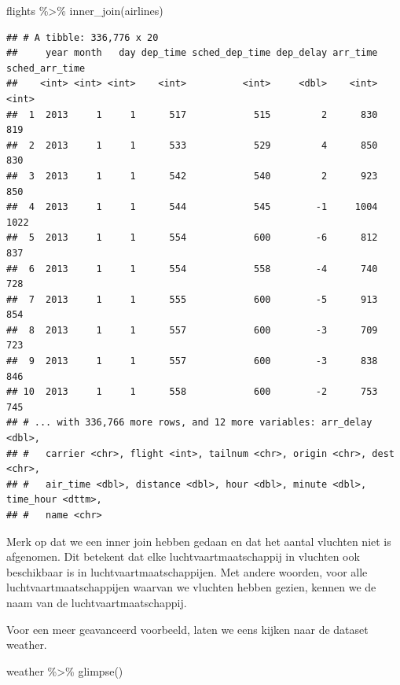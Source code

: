 \documentclass[]{tufte-book}
\newenvironment{Shaded}{}{}
\newcommand{\FunctionTok}[1]{\textcolor[rgb]{0.02,0.16,0.49}{#1}}
\newcommand{\NormalTok}[1]{#1}
\newcommand{\SpecialCharTok}[1]{\textcolor[rgb]{0.25,0.44,0.63}{#1}}
\begin{document}
\begin{Shaded}
\begin{Highlighting}[]
\NormalTok{flights }\SpecialCharTok{\%\textgreater{}\%}
  \FunctionTok{inner\_join}\NormalTok{(airlines)}
\end{Highlighting}
\end{Shaded}

\begin{verbatim}
## # A tibble: 336,776 x 20
##     year month   day dep_time sched_dep_time dep_delay arr_time sched_arr_time
##    <int> <int> <int>    <int>          <int>     <dbl>    <int>          <int>
##  1  2013     1     1      517            515         2      830            819
##  2  2013     1     1      533            529         4      850            830
##  3  2013     1     1      542            540         2      923            850
##  4  2013     1     1      544            545        -1     1004           1022
##  5  2013     1     1      554            600        -6      812            837
##  6  2013     1     1      554            558        -4      740            728
##  7  2013     1     1      555            600        -5      913            854
##  8  2013     1     1      557            600        -3      709            723
##  9  2013     1     1      557            600        -3      838            846
## 10  2013     1     1      558            600        -2      753            745
## # ... with 336,766 more rows, and 12 more variables: arr_delay <dbl>,
## #   carrier <chr>, flight <int>, tailnum <chr>, origin <chr>, dest <chr>,
## #   air_time <dbl>, distance <dbl>, hour <dbl>, minute <dbl>, time_hour <dttm>,
## #   name <chr>
\end{verbatim}

Merk op dat we een inner join hebben gedaan en dat het aantal vluchten niet is afgenomen. Dit betekent dat elke luchtvaartmaatschappij in vluchten ook beschikbaar is in luchtvaartmaatschappijen. Met andere woorden, voor alle luchtvaartmaatschappijen waarvan we vluchten hebben gezien, kennen we de naam van de luchtvaartmaatschappij.

Voor een meer geavanceerd voorbeeld, laten we eens kijken naar de dataset weather.

\begin{Shaded}
\begin{Highlighting}[]
\NormalTok{weather }\SpecialCharTok{\%\textgreater{}\%}
  \FunctionTok{glimpse}\NormalTok{()}
\end{Highlighting}
\end{Shaded}
\end{document}
